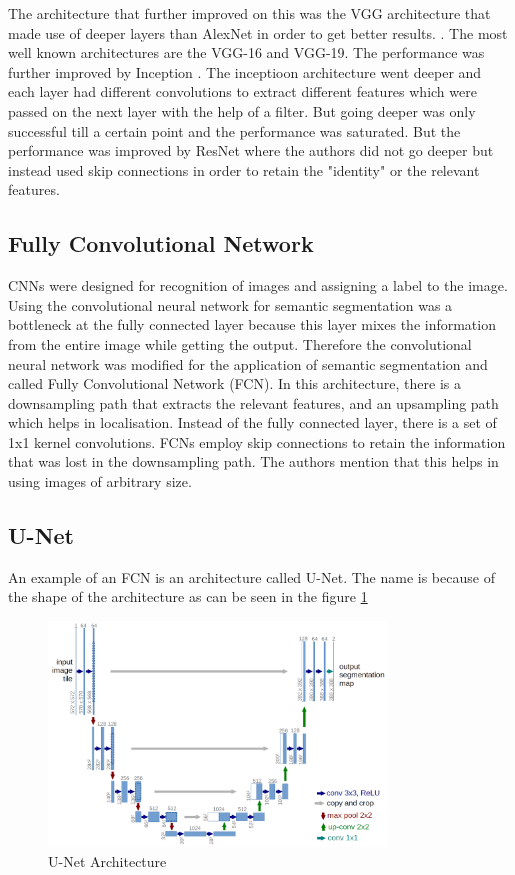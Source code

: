 \documentclass[rnd]{mas_proposal}
\begin{document}
The architecture that further improved on this was the VGG architecture that made use of deeper layers than AlexNet in order to get better results. \cite{VGG}. The most well known architectures are the VGG-16 and VGG-19. The performance was further improved by Inception \cite{Inception}. The inceptioon architecture went deeper and each layer had different convolutions to extract different features which were passed on the next layer with the help of a filter. But going deeper was only successful till a certain point and the performance was saturated. But the performance was improved by ResNet \cite{Res-Net} where the authors did not go deeper but instead used skip connections in order to retain the "identity" or the relevant features. 




\subsection{Fully Convolutional Network}
CNNs were designed for recognition of images and assigning a label to the image. Using the convolutional neural network for semantic segmentation was a bottleneck at the fully connected layer because this layer mixes the information from the entire image while getting the output. Therefore the convolutional neural network was modified for the application of semantic segmentation and called Fully Convolutional Network (FCN).\cite{FCN-long} In this architecture, there is a downsampling path that extracts the relevant features, and an upsampling path which helps in localisation. Instead of the fully connected layer, there is a set of 1x1 kernel convolutions. FCNs employ skip connections to retain the information that was lost in the downsampling path. The authors mention that this helps in using images of arbitrary size. 

\subsection{U-Net}
An example of an FCN is an architecture called U-Net. The name is because of the shape of the architecture as can be seen in the figure \ref{fig:u-net} 

\begin{figure}[htp] 
        \centering
        \includegraphics[width=0.8\textwidth]{images/u-net-architecture.png}
        \caption{U-Net Architecture \cite{u-net}}%
        \label{fig:u-net}%
\end{figure}
\end{document}
